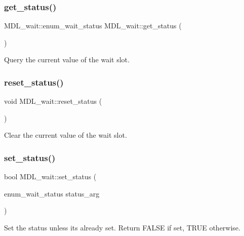 \subsubsection{\texorpdfstring{get\+\_\+status()}{get\_status()}}
{\footnotesize\ttfamily M\+D\+L\+\_\+wait\+::enum\+\_\+wait\+\_\+status M\+D\+L\+\_\+wait\+::get\+\_\+status (\begin{DoxyParamCaption}{ }\end{DoxyParamCaption})}

Query the current value of the wait slot. \mbox{\label{classMDL__wait_ad31def1340b5e95c79479c53c1c2af84}} 
\subsubsection{\texorpdfstring{reset\+\_\+status()}{reset\_status()}}
{\footnotesize\ttfamily void M\+D\+L\+\_\+wait\+::reset\+\_\+status (\begin{DoxyParamCaption}{ }\end{DoxyParamCaption})}

Clear the current value of the wait slot. \mbox{\label{classMDL__wait_a5d2a1397b1b462b9a7308ba573add0a8}} 
\subsubsection{\texorpdfstring{set\+\_\+status()}{set\_status()}}
{\footnotesize\ttfamily bool M\+D\+L\+\_\+wait\+::set\+\_\+status (\begin{DoxyParamCaption}\item[{enum\+\_\+wait\+\_\+status}]{status\+\_\+arg }\end{DoxyParamCaption})}

Set the status unless it\textquotesingle{}s already set. Return F\+A\+L\+SE if set, T\+R\+UE otherwise. \mbox{\label{classMDL__wait_ae5a547f550dbc3ef77d14f16e7cad58b}} 
